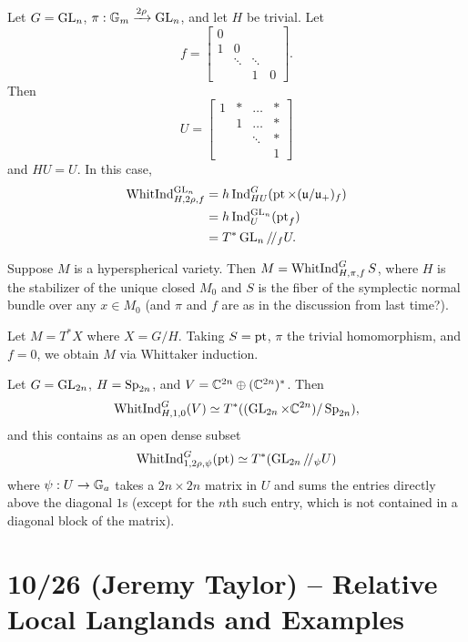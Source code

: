 \documentclass{article}
\begin{document}
\begin{ex}
	Let $G = \operatorname{GL}_n$, $\pi: \mathbb{G}_m \xrightarrow{2\rho} \operatorname{GL}_n$, and let $H$ be trivial.
	Let
	\[
		f = \begin{bmatrix}
			0 & & & \\
			1 & 0 & & \\
			  & \ddots & \ddots & \\
			  & & 1 & 0
		\end{bmatrix}.
	\]
	Then
	\[
		U = \begin{bmatrix}
			1 & * & \dots & * \\
			  & 1 & \dots & * \\
			  & & \ddots & * \\
			  & & & 1
		\end{bmatrix}
	\]
	and $HU = U$.
	In this case,
	\begin{align*}
		\operatorname{WhitInd}_{H,2\rho,f}^{\operatorname{GL}_n} &= h\operatorname{Ind}_{HU}^G(\operatorname{pt} \times (\mathfrak{u} / \mathfrak{u}_+)_f) \\
		&= h\operatorname{Ind}_U^{\operatorname{GL}_n}(\operatorname{pt}_f) \\
		&= T^* \operatorname{GL}_n /\mkern-3mu/_f U.
	\end{align*}
\end{ex}

Suppose $M$ is a hyperspherical variety.
Then $M = \operatorname{WhitInd}_{H,\pi,f}^G S$, where $H$ is the stabilizer of the unique closed $M_0$ and $S$ is the fiber of the symplectic normal bundle over any $x \in M_0$ (and $\pi$ and $f$ are as in the discussion from last time?). 

\begin{ex}
	Let $M = T^*X$ where $X = G/H$.
	Taking $S = \operatorname{pt}$, $\pi$ the trivial homomorphism, and $f = 0$, we obtain $M$ via Whittaker induction.
\end{ex}

\begin{ex}
	Let $G = \operatorname{GL}_{2n}$, $H = \operatorname{Sp}_{2n}$, and $V = \mathbb{C}^{2n} \oplus (\mathbb{C}^{2n})^*$.
	Then
	\[
		\operatorname{WhitInd}_{H,1,0}^G(V) \simeq T^*((\operatorname{GL}_{2n} \times \mathbb{C}^{2n}) / \operatorname{Sp}_{2n}),
	\]
	and this contains as an open dense subset
	\[
		\operatorname{WhitInd}_{1,2\rho,\psi}^G(\operatorname{pt}) \simeq T^*(\operatorname{GL}_{2n} /\mkern-3mu/_\psi U)
	\]
	where $\psi: U \to \mathbb{G}_a$ takes a $2n \times 2n$ matrix in $U$ and sums the entries directly above the diagonal $1$s (except for the $n$th such entry, which is not contained in a diagonal block of the matrix).
\end{ex}

\section{10/26 (Jeremy Taylor) -- Relative Local Langlands and Examples}
\end{document}
